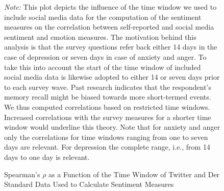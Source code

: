 \documentclass[
  english,
  jou,floatsintext]{apa7}
\begin{document}
\begin{figure}
\caption{Spearman's $\rho$ as a Function of the Time Window of Twitter and Der Standard Data Used to Calculate Sentiment Measures}\label{fig:scatter-lag}
\newline{}


\textit{Note:} This plot depicts the influence of the time window we used to include social media data for the computation of the sentiment measures on the correlation between self-reported and social media sentiment and emotion measures. The motivation behind this analysis is that the survey questions refer back either 14 days in the case of depression or seven days in case of anxiety and anger. To take this into account the start of the time window of included social media data is likewise adopted to either 14 or seven days prior to each survey wave. Past research indicates that the respondent's memory recall might be biased towards more short-termed events. We thus computed correlations based on restricted time windows. Increased correlations with the survey measures for a shorter time window would underline this theory. Note that for anxiety and anger only the correlations for time windows ranging from one to seven days are relevant. For depression the complete range, i.e., from 14 days to one day is relevant.
\end{figure}
\end{document}
